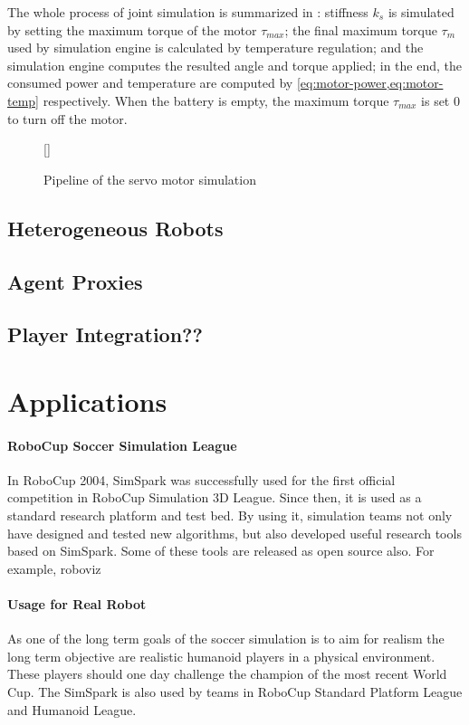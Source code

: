\documentclass{llncs}
\newcommand{\inputtikz}[1]
{
  \StrSubstitute{#1}{/}{.}[\fn]
  \scancs{\filename}{\fn}
  \tikzsetfigurename{\filename}
  
}
\begin{document}
The whole process of joint simulation is summarized in
: stiffness $k_s$ is simulated by setting the maximum torque
of the motor $\tau_{max}$; the final maximum torque $\tau_m$ used by simulation engine is calculated by temperature regulation; and the simulation engine computes the resulted angle
and torque applied; in the end, the consumed power and temperature are
computed by \cref{eq:motor-power,eq:motor-temp} respectively. When the battery is empty, the maximum torque $\tau_{max}$ is set 0 to turn off the motor.
\begin{figure}
  \centering
  \inputtikz{joint}
  \caption{Pipeline of the servo motor simulation}
  \label{fig:joint}
\end{figure}

\subsection{Heterogeneous Robots}

\subsection{Agent Proxies}

\subsection{Player Integration??}

\section{Applications}

\paragraph{RoboCup Soccer Simulation League}
In RoboCup 2004, SimSpark was successfully used for the first official competition in RoboCup Simulation 3D League. Since then, it is used as a standard research platform and test bed. By using it, simulation teams not only have designed and tested new algorithms, but also developed useful research tools based on SimSpark. Some of these tools are released as open source also. For example, roboviz

\paragraph{Usage for Real Robot}
As one of the long term goals of the soccer simulation is to aim for realism the long term objective are realistic humanoid players in a physical environment.
These players should one day challenge the champion of the most recent World Cup.
The SimSpark is also used by teams in RoboCup Standard Platform League and Humanoid League.
\end{document}

